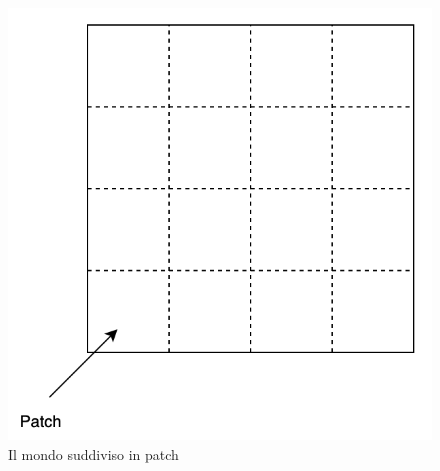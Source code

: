 \begin{figure}[ht]
    \centering
    \includegraphics[scale=0.6]{figures/patch.png}
    \caption{Il mondo suddiviso in patch}\label{fig:patch}
\end{figure}


